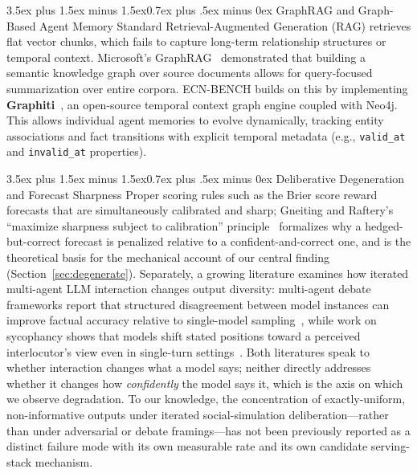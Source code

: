 \documentclass[11pt,journal,onecolumn]{IEEEtran}
\makeatletter
\renewcommand\subsection{\@startsection{subsection}{2}{\z@}%
  {3.5ex plus 1.5ex minus 1.5ex}{0.7ex plus .5ex minus 0ex}%
  {\normalfont\normalsize\bfseries}}
\makeatother
\begin{document}
\subsection{GraphRAG and Graph-Based Agent Memory}
Standard Retrieval-Augmented Generation (RAG) retrieves flat vector chunks, which fails to capture long-term relationship structures or temporal context. Microsoft's GraphRAG~\cite{graphrag2024} demonstrated that building a semantic knowledge graph over source documents allows for query-focused summarization over entire corpora. ECN-BENCH builds on this by implementing \textbf{Graphiti}~\cite{graphiti2024}, an open-source temporal context graph engine coupled with Neo4j. This allows individual agent memories to evolve dynamically, tracking entity associations and fact transitions with explicit temporal metadata (e.g., \texttt{valid\_at} and \texttt{invalid\_at} properties).

\subsection{Deliberative Degeneration and Forecast Sharpness}
\label{sec:related_degeneration}
Proper scoring rules such as the Brier score reward forecasts that are simultaneously calibrated and sharp; Gneiting and Raftery's ``maximize sharpness subject to calibration'' principle~\cite{gneiting2007} formalizes why a hedged-but-correct forecast is penalized relative to a confident-and-correct one, and is the theoretical basis for the mechanical account of our central finding (Section~\ref{sec:degenerate}). Separately, a growing literature examines how iterated multi-agent LLM interaction changes output diversity: multi-agent debate frameworks report that structured disagreement between model instances can improve factual accuracy relative to single-model sampling~\cite{du2023debate}, while work on sycophancy shows that models shift stated positions toward a perceived interlocutor's view even in single-turn settings~\cite{sharma2023sycophancy}. Both literatures speak to whether interaction changes what a model says; neither directly addresses whether it changes how \emph{confidently} the model says it, which is the axis on which we observe degradation. To our knowledge, the concentration of exactly-uniform, non-informative outputs under iterated social-simulation deliberation---rather than under adversarial or debate framings---has not been previously reported as a distinct failure mode with its own measurable rate and its own candidate serving-stack mechanism.
\end{document}
